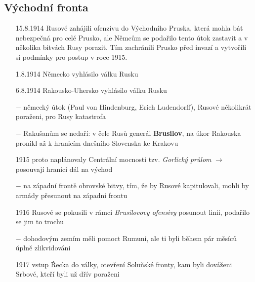 \documentclass{article}
\begin{document}
\subsection*{Východní fronta}
\begin{itemize}
    \vspace{-0.5em}
    \setlength\itemsep{0.15em}
    \item[15.8.1914] Rusové zahájili ofenzívu do Východního Pruska, která mohla bát nebezpečná pro celé Prusko, ale Němcům se podařilo tento útok zastavit a v několika bitvách Rusy porazit. Tím zachránili Prusko před invazí a vytvořili si podmínky pro postup v roce 1915.
    \item[1.8.1914] Německo vyhlásilo válku Rusku
    \item[6.8.1914] Rakousko-Uhersko vyhlásilo válku Rusku
    \item[$-$] německý útok (Paul von Hindenburg, Erich Ludendorff), Rusové několikrát poraženi, pro Rusy katastrofa
    \item[$-$] Rakušanům se nedaří: v čele Rusů generál \textbf{Brusilov}, na úkor Rakouska pronikl až k hranicím dnešního Slovenska ke Krakovu
    \item[1915] proto naplánovaly Centrální mocnosti tzv. \textit{Gorlický průlom} $\rightarrow$ posouvají hranici dál na východ
    \item[$-$] na západní frontě obrovské bitvy, tím, že by Rusové kapitulovali, mohli by armády přesunout na západní frontu
    \item[1916] Rusové se pokusili v rámci \textit{Brusilovovy ofensivy} posunout linii, podařilo se jim to trochu
    \item[$-$] dohodovým zemím měli pomoct Rumuni, ale ti byli během pár měsíců úplně zlikvidováni
    \item[1917] vstup Řecka do války, otevření Soluňské fronty, kam byli dováženi Srbové, kteří byli už dřív poraženi
\end{itemize}
\end{document}

